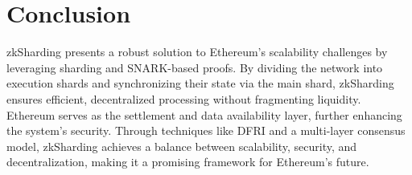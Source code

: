 \section{Conclusion}
zkSharding presents a robust solution to Ethereum's scalability challenges by leveraging sharding and SNARK-based proofs. By dividing the network into execution shards and synchronizing their state via the main shard, zkSharding ensures efficient, decentralized processing without fragmenting liquidity. Ethereum serves as the settlement and data availability layer, further enhancing the system's security. Through techniques like DFRI and a multi-layer consensus model, zkSharding achieves a balance between scalability, security, and decentralization, making it a promising framework for Ethereum’s future.




